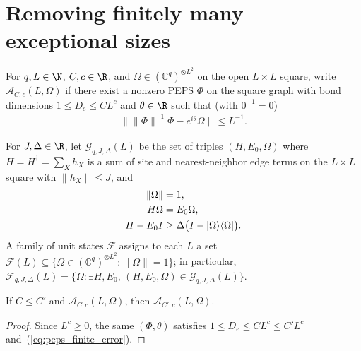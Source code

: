 \section{Removing finitely many exceptional sizes}
\label{sec:peps_exact_finite_exception}

For $q,L\in\N$, $C,c\in\R$, and $\Omega\in(\mathbb C^q)^{\otimes L^2}$ on the
open $L\times L$ square, write $\mathcal A_{C,c}(L,\Omega)$ if there exist a
nonzero PEPS $\Phi$ on the square graph with bond dimensions
$1\le D_e\le CL^c$ and $\theta\in\R$ such that (with $0^{-1}=0$)
\begin{align}
    \bigl\|\|\Phi\|^{-1}\Phi-e^{i\theta}\Omega\bigr\|\le L^{-1}.
    \label{eq:peps_finite_error}
\end{align}

For $J,\Delta\in\R$, let $\mathcal G_{q,J,\Delta}(L)$ be the set of triples
$(H,E_0,\Omega)$ where $H=H^\dagger=\sum_X h_X$ is a sum of site and
nearest-neighbor edge terms on the $L\times L$ square with $\|h_X\|\le J$, and
\begin{align}
    \|\Omega\| & =1,\label{eq:peps_finite_ground}                           \\
    H\Omega    & =E_0\Omega,\notag                                          \\
    H-E_0I     & \ge\Delta\bigl(I-|\Omega\rangle\langle\Omega|\bigr).\notag
\end{align}
A family of unit states $\mathcal F$ assigns to each $L$ a set
$\mathcal F(L)\subseteq\{\Omega\in(\mathbb C^q)^{\otimes L^2}:\|\Omega\|=1\}$;
in particular,
$\mathcal F_{q,J,\Delta}(L)=\{\Omega:\exists H,E_0,\,(H,E_0,\Omega)\in\mathcal G_{q,J,\Delta}(L)\}$.

\begin{lemma}
    \label{thm:peps_prefactor_monotone}
    \leanok
    If $C\le C'$ and $\mathcal A_{C,c}(L,\Omega)$, then
    $\mathcal A_{C',c}(L,\Omega)$.
\end{lemma}
\begin{proof}
    \leanok
    Since $L^c\ge0$, the same $(\Phi,\theta)$ satisfies
    $1\le D_e\le CL^c\le C'L^c$ and~(\ref{eq:peps_finite_error}).
\end{proof}

